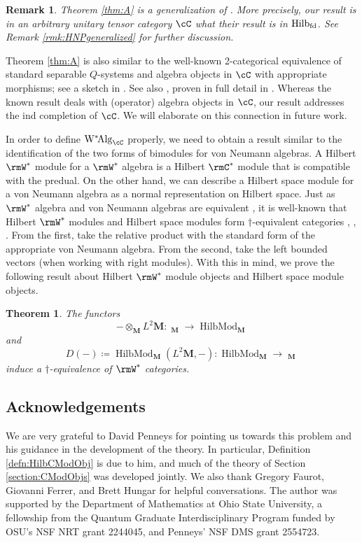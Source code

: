 \documentclass[11pt,reqno]{amsart}
\DeclareMathOperator{\Hilb}{Hilb}
\DeclareMathOperator{\WMod}{W^*Mod}
\DeclareMathOperator{\HilbMod}{HilbMod}
\DeclareMathOperator{\WAlg}{W^*\!Alg}
\newcommand{\bb}[1]{\mathbf{#1}}
\numberwithin{equation}{section}
\theoremstyle{plain}
\newtheorem*{rmk*}{Remark}
\newtheorem{thmalpha}{Theorem}
\begin{document}
\begin{rmk*}
Theorem \ref{thm:A} is a generalization of \cite[Theorem~7.4]{HNP24}.
More precisely, our result is in an arbitrary unitary tensor category $\cC$ what their result is in $\Hilb_{\rm fd}$.
See Remark \ref{rmk:HNPgeneralized} for further discussion.
\end{rmk*}
Theorem \ref{thm:A} is also similar to the well-known 2-categorical equivalence of standard separable $Q$-systems and algebra objects in $\cC$ with appropriate morphisms; see a sketch in \cite[Example~3.39]{CHPJP22}.
See also \cite[Theorem~3.21]{Ver22}, proven in full detail in \cite[Appendix~6.2]{Ver22}.
Whereas the known result deals with (operator) algebra objects in $\cC$, our result addresses the ind completion of $\cC$.
We will elaborate on this connection in future work.

In order to define $\WAlg_{\cC}$ properly, we need to obtain a result similar to the identification of the two forms of bimodules for von Neumann algebras.
A Hilbert $\rmW^*$ module for a $\rmW^*$ algebra is a Hilbert $\rmC^*$ module that is compatible with the predual.
On the other hand, we can describe a Hilbert space module for a von Neumann algebra as a normal representation on Hilbert space.
Just as $\rmW^*$ algebra and von Neumann algebras are equivalent \cite{Sak98}, it is well-known that Hilbert $\rmW^*$ modules and Hilbert space modules form $\dagger$-equivalent categories \cite[8.5.39]{BLM04}, \cite[1.4]{DH94}, \cite[Theorem~2.2]{BDH88}.
From the first, take the relative product with the standard form of the appropriate von Neumann algebra.
From the second, take the left bounded vectors (when working with right modules).
With this in mind, we prove the following result about Hilbert $\rmW^*$ module objects and Hilbert space module objects.
\begin{thmalpha} \label{thm:B}
The functors $$- \otimes_{\bb M} L^2 \bb M \colon \WMod_{\bb M} \to \HilbMod_{\bb M}$$ and $$D(-) \coloneq \HilbMod_{\bb M}(L^2 \bb M, -) \colon \HilbMod_{\bb M} \to \WMod_{\bb M}$$ induce a $\dagger$-equivalence of $\rmW^*$ categories.
\end{thmalpha}

\subsection*{Acknowledgements}
We are very grateful to David Penneys for pointing us towards this problem and his guidance in the development of the theory.
In particular, Definition \ref{defn:HilbCModObj} is due to him, and much of the theory of Section \ref{section:CModObjs} was developed jointly.
We also thank Gregory Faurot, Giovanni Ferrer, and Brett Hungar for helpful conversations.
The author was supported by the Department of Mathematics at Ohio State University, a fellowship from the Quantum Graduate Interdisciplinary Program funded by OSU's NSF NRT grant 2244045, and Penneys' NSF DMS grant 2554723.
\end{document}
